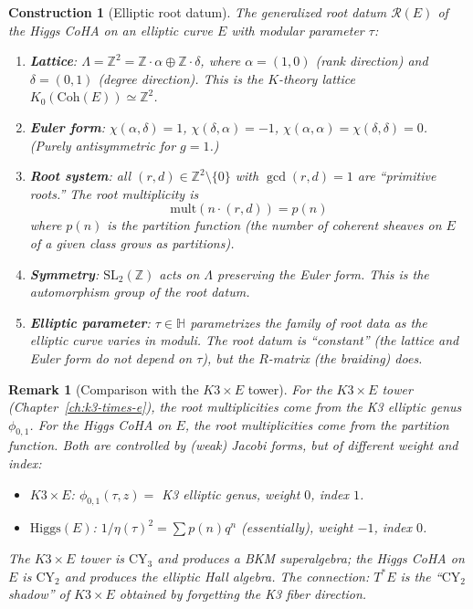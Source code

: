 \documentclass[11pt]{article}
\theoremstyle{garamondthm}
\theoremstyle{garamonddef}
\newtheorem{construction}[theorem]{Construction}
\theoremstyle{garamondrem}
\newtheorem{remark}[theorem]{Remark}
\newcommand{\Coh}{\mathrm{Coh}}
\newcommand{\CY}{\mathrm{CY}}
\newcommand{\Higgs}{\mathrm{Higgs}}
\newcommand{\SL}{\mathrm{SL}}
\begin{document}
\begin{construction}[Elliptic root datum]
\label{constr:elliptic-root-datum}
The generalized root datum $\mathcal{R}(E)$ of the Higgs CoHA on an elliptic curve $E$ with modular parameter $\tau$:
\begin{enumerate}[label=(\roman*)]
 \item \textbf{Lattice}: $\Lambda = \mathbb{Z}^2 = \mathbb{Z} \cdot \alpha \oplus \mathbb{Z} \cdot \delta$, where $\alpha = (1, 0)$ (rank direction) and $\delta = (0, 1)$ (degree direction). This is the $K$-theory lattice $K_0(\Coh(E)) \simeq \mathbb{Z}^2$.
 \item \textbf{Euler form}: $\chi(\alpha, \delta) = 1$, $\chi(\delta, \alpha) = -1$, $\chi(\alpha, \alpha) = \chi(\delta, \delta) = 0$. (Purely antisymmetric for $g = 1$.)
 \item \textbf{Root system}: all $(r, d) \in \mathbb{Z}^2 \setminus \{0\}$ with $\gcd(r, d) = 1$ are ``primitive roots.'' The root multiplicity is
 \[
 \mathrm{mult}(n \cdot (r, d)) = p(n)
 \]
 where $p(n)$ is the partition function (the number of coherent sheaves on $E$ of a given class grows as partitions).
 \item \textbf{Symmetry}: $\SL_2(\mathbb{Z})$ acts on $\Lambda$ preserving the Euler form. This is the automorphism group of the root datum.
 \item \textbf{Elliptic parameter}: $\tau \in \mathbb{H}$ parametrizes the family of root data as the elliptic curve varies in moduli. The root datum is ``constant'' (the lattice and Euler form do not depend on $\tau$), but the $R$-matrix (the braiding) does.
\end{enumerate}
\end{construction}

\begin{remark}[Comparison with the $K3 \times E$ tower]
\label{rem:comparison-k3e}
For the $K3 \times E$ tower (Chapter~\ref{ch:k3-times-e}), the root multiplicities come from the K3 elliptic genus $\phi_{0,1}$. For the Higgs CoHA on $E$, the root multiplicities come from the partition function. Both are controlled by (weak) Jacobi forms, but of different weight and index:
\begin{itemize}
 \item $K3 \times E$: $\phi_{0,1}(\tau, z) = $ K3 elliptic genus, weight $0$, index $1$.
 \item $\Higgs(E)$: $1/\eta(\tau)^2 = \sum p(n) q^n$ (essentially), weight $-1$, index $0$.
\end{itemize}
The $K3 \times E$ tower is $\CY_3$ and produces a BKM superalgebra; the Higgs CoHA on $E$ is $\CY_2$ and produces the elliptic Hall algebra. The connection: $T^*E$ is the ``$\CY_2$ shadow'' of $K3 \times E$ obtained by forgetting the K3 fiber direction.
\end{remark}
\end{document}
